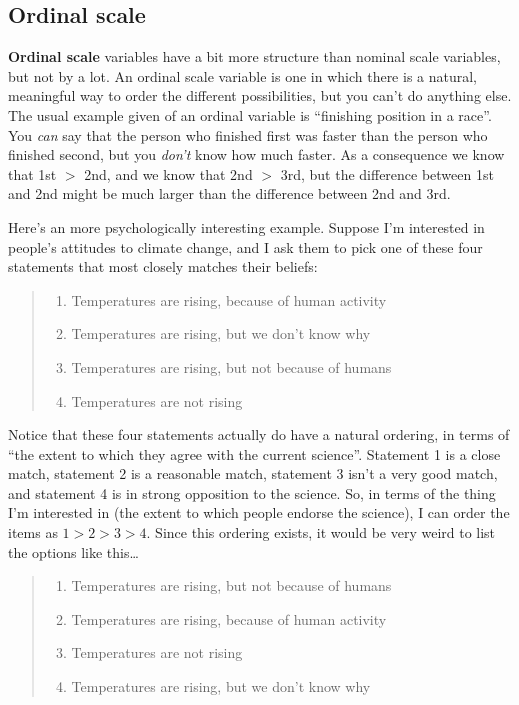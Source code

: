 \documentclass[
]{book}
\providecommand{\tightlist}{%
  \setlength{\itemsep}{0pt}\setlength{\parskip}{0pt}}
\begin{document}
\subsection{Ordinal scale}\label{ordinal-scale}

\textbf{Ordinal scale} variables have a bit more structure than nominal scale variables, but not by a lot. An ordinal scale variable is one in which there is a natural, meaningful way to order the different possibilities, but you can't do anything else. The usual example given of an ordinal variable is ``finishing position in a race''. You {\emph{can}} say that the person who finished first was faster than the person who finished second, but you {\emph{don't}} know how much faster. As a consequence we know that 1st \(>\) 2nd, and we know that 2nd \(>\) 3rd, but the difference between 1st and 2nd might be much larger than the difference between 2nd and 3rd.

Here's an more psychologically interesting example. Suppose I'm interested in people's attitudes to climate change, and I ask them to pick one of these four statements that most closely matches their beliefs:

\begin{quote}
\begin{enumerate}
\def\labelenumi{(\arabic{enumi})}
\tightlist
\item
  Temperatures are rising, because of human activity\\
\item
  Temperatures are rising, but we don't know why\\
\item
  Temperatures are rising, but not because of humans\\
\item
  Temperatures are not rising
\end{enumerate}
\end{quote}

Notice that these four statements actually do have a natural ordering, in terms of ``the extent to which they agree with the current science''. Statement 1 is a close match, statement 2 is a reasonable match, statement 3 isn't a very good match, and statement 4 is in strong opposition to the science. So, in terms of the thing I'm interested in (the extent to which people endorse the science), I can order the items as \(1 > 2 > 3 > 4\). Since this ordering exists, it would be very weird to list the options like this\ldots{}

\begin{quote}
\begin{enumerate}
\def\labelenumi{(\arabic{enumi})}
\setcounter{enumi}{2}
\tightlist
\item
  Temperatures are rising, but not because of humans\\
\item
  Temperatures are rising, because of human activity\\
\item
  Temperatures are not rising\\
\item
  Temperatures are rising, but we don't know why
\end{enumerate}
\end{quote}
\end{document}

